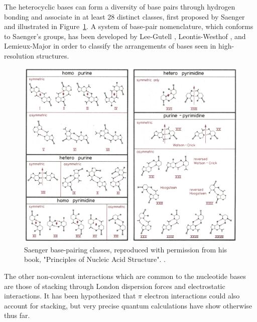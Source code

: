 The  heterocyclic bases  can form  a diversity  of base  pairs through
hydrogen bonding and associate in  at least 28 distinct classes, first
proposed   by   Saenger    \cite{saenger1984}   and   illustrated   in
Figure~\ref{fig:saenger28}. A system of base-pair nomenclature, which
conforms  to  Saenger's  groups,  has  been  developed  by  Lee-Gutell
\cite{lee2004}, Leontis-Westhof \cite{leontis2002b}, and Lemieux-Major
\cite{lemieux2002} in order to classify the arrangements of bases seen
in high-resolution structures.

\begin{figure}
\centering
\includegraphics[scale=3.5, angle=90]{Chapter1/saenger28c.png}
\caption{Saenger base-pairing classes, reproduced with permission from
  his       book,        "Principles       of       Nucleic       Acid
  Structure". \cite{saenger1984}.}
\label{fig:saenger28}
\end{figure}  

The other non-covalent interactions which are common to the nucleotide
bases  are those  of  stacking through  London  dispersion forces  and
electrostatic  interactions.   It  has  been hypothesized  that  $\pi$
electron  interactions  could  also  account for  stacking,  but  very
precise quantum  calculations \cite{sponer1996, sponer1997}  have show
otherwise thus far.

